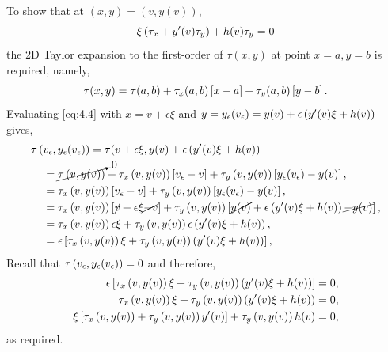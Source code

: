 To show that at $(x,y) = (v,y(v))$,
\[\xi\left(\tau_x+y^\prime(v)\tau_y\right)+h(v)\tau_y=0\]
the 2D Taylor expansion to the first-order of $\tau(x,y)$ at point $x=a, y=b$ is required, namely,
\begin{equation}
\label{eq:4.4}
\tau(x,y) = \tau(a,b) + \tau_x(a,b)\left[x-a\right] + \tau_y(a,b)\left[y-b\right].
\end{equation}
Evaluating \eqref{eq:4.4} with $x=v + \epsilon\xi$ and $y=y_\epsilon(v_\epsilon)=y(v) + \epsilon\left(y^\prime(v)\xi+h(v)\right)$ gives,
\begin{equation*}
\begin{split}
\tau&\left(v_\epsilon,y_\epsilon(v_\epsilon)\right) = \tau(v+\epsilon\xi,y(v)+\epsilon\left(y^\prime(v)\xi+h(v)\right)\\
&\;\;= \cancelto{0}{\tau\left(v,y(v)\right)} + \tau_x\left(v,y(v)\right)\left[v_\epsilon-v\right]+\tau_y\left(v,y(v)\right)\left[y_\epsilon(v_\epsilon)-y(v)\right],\\
&\;\;= \tau_x\left(v,y(v)\right)\left[v_\epsilon-v\right]+\tau_y\left(v,y(v)\right)\left[y_\epsilon(v_\epsilon)-y(v)\right],\\
&\;\;= \tau_x\left(v,y(v)\right)\left[\cancel{v}+\epsilon\xi\cancel{-v}\right]+\tau_y\left(v,y(v)\right)\left[\cancel{y(v)} + \epsilon\left(y^\prime(v)\xi+h(v)\right)\cancel{-y(v)}\right],\\
&\;\;= \tau_x\left(v,y(v)\right)\epsilon\xi+\tau_y\left(v,y(v)\right)\epsilon\left(y^\prime(v)\xi+h(v)\right),\\
&\;\;= \epsilon\left[\tau_x\left(v,y(v)\right)\xi+\tau_y\left(v,y(v)\right)\left(y^\prime(v)\xi+h(v)\right)\right],\\
\end{split}
\end{equation*}
Recall that $\tau\left(v_\epsilon,y_\epsilon(v_\epsilon)\right) = 0$ and therefore,
\begin{equation*}
\begin{split}
	\epsilon\left[\tau_x\left(v,y(v)\right)\xi+\tau_y\left(v,y(v)\right)\left(y^\prime(v)\xi+h(v)\right)\right] &= 0,\\
	\tau_x\left(v,y(v)\right)\xi+\tau_y\left(v,y(v)\right)\left(y^\prime(v)\xi+h(v)\right) &= 0,\\
	\xi\left[\tau_x\left(v,y(v)\right) + \tau_y\left(v,y(v)\right) y^\prime(v)\right] + \tau_y\left(v,y(v)\right) h(v) &= 0,
\end{split}
\end{equation*}
as required.

